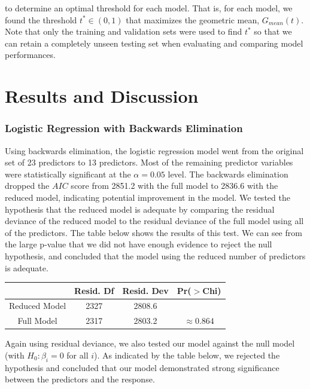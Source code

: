 \documentclass[10pt]{article}
\begin{document}
to determine an optimal threshold for each model. That is, for each model, we found the threshold $t^* \in (0, 1)$ that maximizes the geometric mean, $G_{mean}(t)$. Note that only the training and validation sets were used to find $t^*$ so that we can retain a completely unseen testing set when evaluating and comparing model performances. 

\section*{Results and Discussion}

\subsubsection*{Logistic Regression with Backwards Elimination}

Using backwards elimination, the logistic regression model went from the original set of 23 predictors to 13 predictors. Most of the remaining predictor variables were statistically significant at the $\alpha = 0.05$ level. The backwards elimination dropped the $AIC$ score from 2851.2 with the full model to 2836.6 with the reduced model, indicating potential improvement in the model. We tested the hypothesis that the reduced model is adequate by comparing the residual deviance of the reduced model to the residual deviance of the full model using all of the predictors. The table below shows the results of this test. We can see from the large p-value that we did not have enough evidence to reject the null hypothesis, and concluded that the model using the reduced number of predictors is adequate.

\begin{table}[h!]
\centering
\begin{tabular}{| c | c | c | c | } 
\hline
& Resid. Df & Resid. Dev & Pr($>$Chi) \\ 
\hline
\hline
Reduced Model & 2327 & 2808.6 & \\
\hline
Full Model & 2317 & 2803.2 & $\approx 0.864$\\
\hline  
\end{tabular}
\end{table}

Again using residual deviance, we also tested our model against the null model (with $H_0: \beta_i = 0$ for all $i$). As indicated by the table below, we rejected the hypothesis and concluded that our model demonstrated strong significance between the predictors and the response. 
\end{document}
